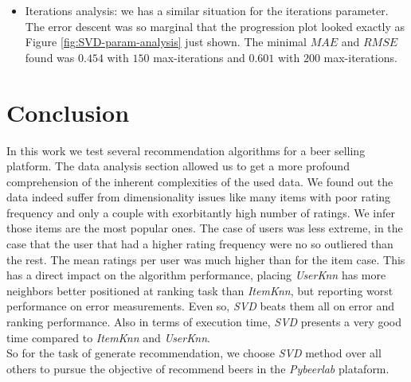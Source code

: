\documentclass[letterpaper, 10 pt, conference]{ieeeconf}  %
\begin{document}
\begin{enumerate}
\begin{itemize}
        \item Iterations analysis: we has a similar situation for the iterations parameter. The error descent was so marginal that the progression plot looked exactly as Figure \ref{fig:SVD-param-analysis} just shown. The minimal $MAE$ and $RMSE$ found was $0.454$ with $150$ max-iterations and $0.601$ with $200$ max-iterations.
        
    \end{itemize}
    
\end{enumerate}

\section{Conclusion}

In this work we test several recommendation algorithms for a beer selling platform. The data analysis section allowed us to get a more profound comprehension of the inherent complexities of the used data. We found out the data indeed suffer from dimensionality issues like many items with poor rating frequency and only a couple with exorbitantly high number of ratings.  We infer those items are the most popular ones. The case of users was less extreme, in the case that the user that had a higher rating frequency were no so outliered than the rest. The mean ratings per user was much higher than for the item case. This has a direct impact on the algorithm performance, placing \textit{UserKnn} has more neighbors better positioned at ranking task than \textit{ItemKnn}, but reporting worst performance on error measurements. Even so, \textit{SVD} beats them all on error and ranking performance. Also in terms of execution time, \textit{SVD} presents a very good time compared to \textit{ItemKnn} and \textit{UserKnn}.\\
So for the task of generate recommendation, we choose \textit{SVD} method over all others to pursue the objective of recommend beers in the \textit{Pybeerlab} plataform.




\addtolength{\textheight}{-12cm}   %
\end{document}
